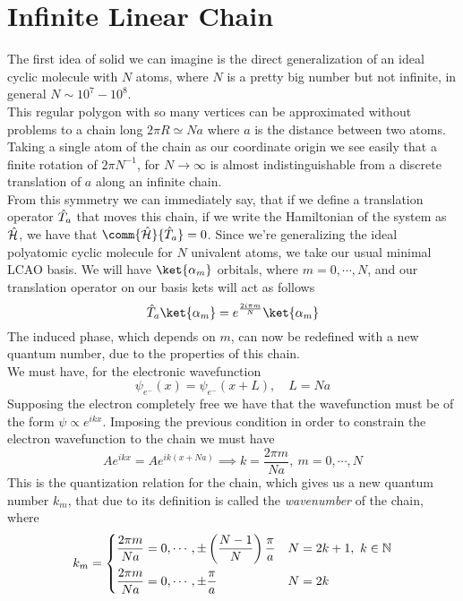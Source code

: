\documentclass[../qm.tex]{subfiles}
\begin{document}
\section{Infinite Linear Chain}
The first idea of solid we can imagine is the direct generalization of an ideal cyclic molecule with $N$ atoms, where $N$ is a pretty big number but not infinite, in general $N\sim10^7-10^8$.\\
This regular polygon with so many vertices can be approximated without problems to a chain long $2\pi R\simeq Na$ where $a$ is the distance between two atoms. Taking a single atom of the chain as our coordinate origin we see easily that a finite rotation of $2\pi N^{-1}$, for $N\to\infty$ is almost indistinguishable from a discrete translation of $a$ along an infinite chain.\\
From this symmetry we can immediately say, that if we define a translation operator $\hat{T}_{a}$ that moves this chain, if we write the Hamiltonian of the system as $\hat{\mathcal{H}}$, we have that $\comm{\opr{\ham}}{\opr{T}_a}=0$. Since we're generalizing the ideal polyatomic cyclic molecule for $N$ univalent atoms, we take our usual minimal LCAO basis. We will have $\ket{\alpha_m}$ orbitals, where $m=0,\cdots,N$, and our translation operator on our basis kets will act as follows
\begin{equation}
	\opr{T}_a\ket{\alpha_m}=e^{\frac{2i\pi m}{N}}\ket{\alpha_m}
	\label{eq:translationop}
\end{equation}
The induced phase, which depends on $m$, can now be redefined with a new quantum number, due to the properties of this chain.\\
We must have, for the electronic wavefunction
\begin{equation}
	\psi_{e^-}(x)=\psi_{e^-}(x+L),\quad L=Na
	\label{eq:chainelectron}
\end{equation}
Supposing the electron completely free we have that the wavefunction must be of the form $\psi\propto e^{ikx}$. Imposing the previous condition in order to constrain the electron wavefunction to the chain we must have
\begin{equation}
	Ae^{ikx}=Ae^{ik(x+Na)}\implies k=\frac{2\pi m}{Na},\ m=0,\cdots,N
	\label{eq:chainquantization}
\end{equation}
This is the quantization relation for the chain, which gives us a new quantum number $k_m$, that due to its definition is called the \emph{wavenumber} of the chain, where
\begin{equation}
	k_m=\begin{dcases}
		\frac{2\pi m}{Na}=0,\cdots,\pm\left( \frac{N-1}{N} \right)\frac{\pi}{a}&N=2k+1,\ k\in\mathbb{N}\\
		\frac{2\pi m}{Na}=0,\cdots,\pm\frac{\pi}{a}&N=2k
		\end{dcases}
	\label{eq:kmquantumnumb}
\end{equation}
\end{document}
